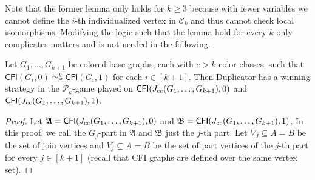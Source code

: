 \documentclass[]{lmcs}
\newcommand{\StructA}{\mathfrak{A}}
\newcommand{\StructB}{\mathfrak{B}}
\newcommand{\StructVA}{A}
\newcommand{\StructVB}{B}
\newcommand{\Ck}[1]{\mathcal{C}_{#1}}
\newcommand{\CFIsym}{\mathsf{CFI}}
\newcommand{\CFI}[1]{\CFIsym(#1)}
\newcommand{\kequiv}[1]{\simeq^#1_{\mathcal{C}}}
\newcommand{\Pk}[1]{\mathcal{P}_{#1}}
\begin{document}
Note that the former lemma only holds for $k\geq3$ because with fewer variables
we cannot define the $i$-th individualized vertex in $\Ck{k}$
and thus cannot check local isomorphisms.
Modifying the logic such that the lemma hold for every $k$
only complicates matters and is not needed in the following.

\begin{lem}
	\label{lem:pk-CFI undistinguishable}
	Let $G_1, \dots, G_{k+1}$ be colored base graphs,
	each with $c > k$ color classes,
	such that $\CFI{G_i,0}\kequiv{k}\CFI{G_i, 1}$ for each $i \in [k+1]$. 
	Then Duplicator has a winning strategy in the $\Pk{k}$-game
	played on $\CFI{\ccjoin{G_1, \dots, G_{k+1}},0}$ and $\CFI{\ccjoin{G_1, \dots, G_{k+1}},1}$.
\end{lem}
\begin{proof}
	Let $\StructA = \CFI{\ccjoin{G_1, \dots, G_{k+1}},0}$ and $\StructB = \CFI{\ccjoin{G_1, \dots, G_{k+1}},1}$.
	In this proof, we call the $G_j$-part in $\StructA$ and $\StructB$ just the $j$-th part.
	Let $V_J\subseteq \StructVA=\StructVB$ be the set of join vertices and $V_j\subseteq \StructVA=\StructVB$ be the set of part vertices of the $j$-th part for every $j \in [k+1]$
	(recall that CFI graphs are defined over the same vertex set).


\end{proof}
\end{document}
